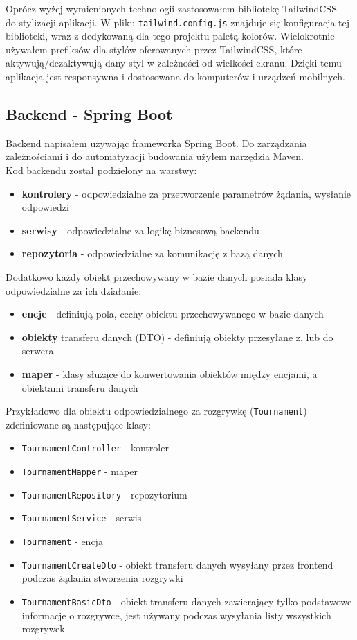 \documentclass[shortabstract]{iithesis}
\begin{document}
Oprócz wyżej wymienionych technologii zastosowałem bibliotekę TailwindCSS~\cite{TailwindCSS} do stylizacji aplikacji.
W pliku \texttt{tailwind.config.js} znajduje się konfiguracja tej biblioteki, wraz z dedykowaną dla tego projektu paletą kolorów.
Wielokrotnie używałem prefiksów dla stylów oferowanych przez TailwindCSS, które aktywują/dezaktywują dany styl w zależności od wielkości ekranu.
Dzięki temu aplikacja jest responsywna i dostosowana do komputerów i urządzeń mobilnych.


\subsection{Backend - Spring Boot}
Backend napisałem używając frameworka Spring Boot. Do zarządzania zależnościami i do automatyzacji budowania użyłem narzędzia Maven.
\\Kod backendu został podzielony na warstwy:
\begin{itemize}
    \item \textbf{kontrolery} - odpowiedzialne za przetworzenie parametrów żądania, wysłanie odpowiedzi
    \item \textbf{serwisy} - odpowiedzialne za logikę biznesową backendu
    \item \textbf{repozytoria} - odpowiedzialne za komunikację z bazą danych
\end{itemize}
Dodatkowo każdy obiekt przechowywany w bazie danych posiada klasy odpowiedzialne za ich działanie:
\begin{itemize}
    \item \textbf{encje} - definiują pola, cechy obiektu przechowywanego w bazie danych
    \item \textbf{obiekty} transferu danych (DTO) - definiują obiekty przesyłane z, lub do serwera
    \item \textbf{maper} - klasy służące do konwertowania obiektów między encjami, a obiektami transferu danych
\end{itemize}
Przykładowo dla obiektu odpowiedzialnego za rozgrywkę (\texttt{Tournament}) zdefiniowane są następujące klasy:
\begin{itemize}
    \item \texttt{TournamentController} - kontroler
    \item \texttt{TournamentMapper} - maper
    \item \texttt{TournamentRepository} - repozytorium
    \item \texttt{TournamentService} - serwis
    \item \texttt{Tournament} - encja
    \item \texttt{TournamentCreateDto} - obiekt transferu danych wysyłany przez frontend podczas żądania stworzenia rozgrywki
    \item \texttt{TournamentBasicDto} - obiekt transferu danych zawierający tylko podstawowe informacje o rozgrywce, jest używany podczas wysyłania listy wszystkich rozgrywek
\end{itemize}
\end{document}
